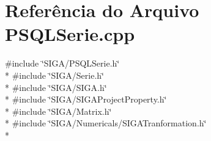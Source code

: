 \section{Referência do Arquivo P\+S\+Q\+L\+Serie.\+cpp}
\label{_p_s_q_l_serie_8cpp}
{\ttfamily \#include \char`\"{}S\+I\+G\+A/\+P\+S\+Q\+L\+Serie.\+h\char`\"{}}\\*
{\ttfamily \#include \char`\"{}S\+I\+G\+A/\+Serie.\+h\char`\"{}}\\*
{\ttfamily \#include \char`\"{}S\+I\+G\+A/\+S\+I\+G\+A.\+h\char`\"{}}\\*
{\ttfamily \#include \char`\"{}S\+I\+G\+A/\+S\+I\+G\+A\+Project\+Property.\+h\char`\"{}}\\*
{\ttfamily \#include \char`\"{}S\+I\+G\+A/\+Matrix.\+h\char`\"{}}\\*
{\ttfamily \#include \char`\"{}S\+I\+G\+A/\+Numericals/\+S\+I\+G\+A\+Tranformation.\+h\char`\"{}}\\*
